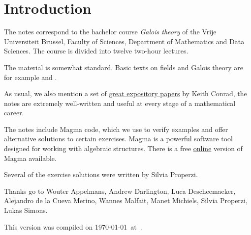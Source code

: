 \section*{Introduction}

The notes correspond to the bachelor 
course \emph{Galois theory} of the 
Vrije Universiteit Brussel, 
Faculty of Sciences, 
Department of Mathematics and Data Sciences. The course
is divided into twelve two-hour lectures. 

The material is somewhat standard. Basic texts on fields and Galois theory 
are for example \cite{MR1645586} and 
\cite{MR3379917}. 

As usual, we also mention a set of 
\href{https://kconrad.math.uconn.edu/blurbs/}{great expository papers} by 
Keith Conrad, the notes are extremely well-written and useful  
at every stage of a mathematical career. 


The notes include Magma code, which we use to verify examples and offer alternative solutions to certain exercises. Magma \cite{zbMATH01077111} is a powerful software tool designed for working with algebraic structures. There is a free \href{https://magma.maths.usyd.edu.au/calc/}{online} version of Magma available.

Several of the exercise solutions were written by Silvia Properzi.
 
Thanks go to Wouter Appelmans, Andrew Darlington, Luca Descheemaeker, 
Alejandro de la Cueva Merino, 
Wannes Malfait, Manet Michiels, Silvia Properzi, 
Lukas Simons. 


This version 
was compiled on \today~at~\currenttime.
